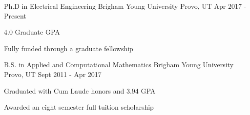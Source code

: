 

\begin{cventries}

  \cventry
    {Ph.D in Electrical Engineering} %
    {Brigham Young University} %
    {Provo, UT} %
    {Apr 2017 - Present} %
    {
      \begin{cvitems}
        \item {4.0 Graduate GPA}
        \item {Fully funded through a graduate fellowship}
      \end{cvitems}
    }

  \cventry
    {B.S. in Applied and Computational Mathematics} %
    {Brigham Young University} %
    {Provo, UT} %
    {Sept 2011 - Apr 2017} %
    {
      \begin{cvitems} %
        \item {Graduated with Cum Laude honors and 3.94 GPA}
        \item {Awarded an eight semester full tuition scholarship}
      \end{cvitems}
    }

\end{cventries}
